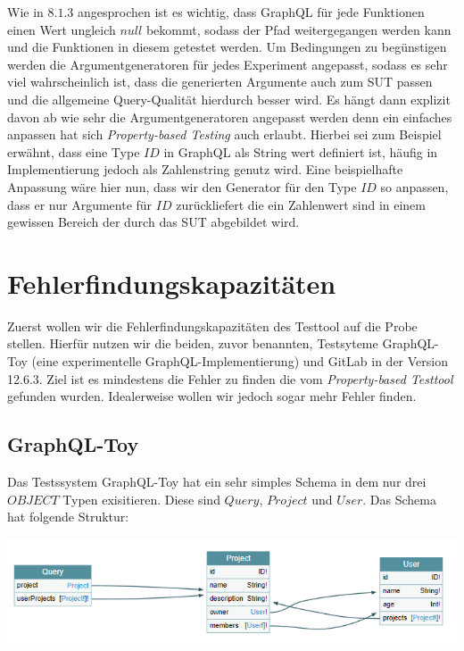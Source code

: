 Wie in $8.1.3$ angesprochen ist es wichtig, dass GraphQL für jede Funktionen einen Wert ungleich $null$ bekommt, sodass der
Pfad weitergegangen werden kann und die Funktionen in diesem getestet werden.
Um Bedingungen zu begünstigen werden die Argumentgeneratoren für jedes Experiment angepasst, sodass es sehr viel wahrscheinlich ist, dass
die generierten Argumente auch zum SUT passen und die allgemeine Query-Qualität hierdurch besser wird.
Es hängt dann explizit davon ab wie sehr die Argumentgeneratoren angepasst werden denn ein einfaches anpassen hat sich \textit{Property-based Testing}\cite{property-based-testing}
auch erlaubt.
Hierbei sei zum Beispiel erwähnt, dass eine Type $ID$ in GraphQL als String wert definiert ist, häufig in Implementierung jedoch als Zahlenstring genutz wird.
Eine beispielhafte Anpassung wäre hier nun, dass wir den Generator für den Type $ID$ so anpassen, dass er nur Argumente für  $ID$ zurückliefert die ein Zahlenwert sind
in einem gewissen Bereich der durch das SUT abgebildet wird.


\section{Fehlerfindungskapazitäten}

Zuerst wollen wir die Fehlerfindungskapazitäten des Testtool auf die Probe stellen.
Hierfür nutzen wir die beiden, zuvor benannten, Testsyteme GraphQL-Toy (eine experimentelle GraphQL-Implementierung) und GitLab in der Version 12.6.3.
Ziel ist es mindestens die Fehler zu finden die vom \textit{Property-based Testtool}\cite{property-based-testing} gefunden wurden.
Idealerweise wollen wir jedoch sogar mehr Fehler finden.

\subsection{GraphQL-Toy}

Das Testssystem GraphQL-Toy hat ein sehr simples Schema in dem nur drei $OBJECT$ Typen exisitieren.
Diese sind $Query$, $Project$ und $User$. 
Das Schema hat folgende Struktur: \\
\begin{center}
    \includegraphics{img/graphqltoy}
\end{center}

